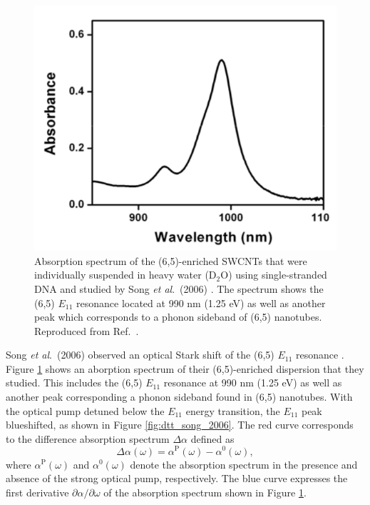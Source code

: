 \begin{figure}[ht]
	\centering
	\includegraphics[scale=0.4]{images/chapter_prior_works/absorption_spectrum_song_2006}
	\caption{Absorption spectrum of the (6,5)-enriched SWCNTs that were individually suspended in heavy water ($\text{D}_2 \text{O}$) using single-stranded DNA \cite{zheng2003structure} and studied by Song \textit{et al}.\ (2006) \cite{song2006optical}. The spectrum shows the (6,5) $E_{11}$ resonance located at 990 nm (1.25 eV) as well as another peak which corresponds to a phonon sideband of (6,5) nanotubes. Reproduced from Ref.\  \cite{song2006optical}.}
	\label{fig:abs_song_2006}
\end{figure}

Song \textit{et al}.\ (2006) \cite{song2006optical} observed an optical Stark shift of the (6,5) $E_{11}$ resonance . Figure \ref{fig:abs_song_2006} shows an aborption spectrum of their (6,5)-enriched dispersion that they studied. This includes the (6,5) $E_{11}$ resonance at 990 nm (1.25 eV) as well as another peak corresponding a phonon sideband found in (6,5) nanotubes. With the optical pump detuned below the $E_{11}$ energy transition, the $E_{11}$ peak blueshifted, as shown in Figure \ref{fig:dtt_song_2006}. The red curve corresponds to the difference absorption spectrum $\Delta \alpha$ defined as
\begin{equation}
	\Delta\alpha(\omega) = \alpha^\text{P}(\omega) - \alpha^0(\omega),
\end{equation}
where $\alpha^\text{P}(\omega)$ and $\alpha^\text{0}(\omega)$ denote the absorption spectrum in the presence and absence of the strong optical pump, respectively. The blue curve expresses  the first derivative $\partial\alpha / \partial\omega$ of the absorption spectrum shown in Figure \ref{fig:abs_song_2006}.

